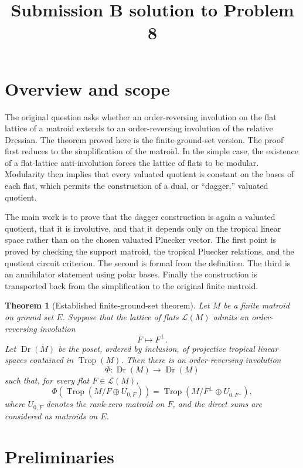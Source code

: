 \documentclass[12pt]{article}
\newtheorem{theorem}{Theorem}
\theoremstyle{definition}
\newcommand{\Trop}{\operatorname{Trop}}
\newcommand{\Dr}{\operatorname{Dr}}
\newcommand{\cL}{\mathcal L}
\begin{document}
\title{Submission B solution to Problem 8}
\date{}
\maketitle

\section*{Overview and scope}

The original question asks whether an order-reversing involution on the flat lattice of a matroid extends to an order-reversing involution of the relative Dressian.  The theorem proved here is the finite-ground-set version.  The proof first reduces to the simplification of the matroid.  In the simple case, the existence of a flat-lattice anti-involution forces the lattice of flats to be modular.  Modularity then implies that every valuated quotient is constant on the bases of each flat, which permits the construction of a dual, or ``dagger,'' valuated quotient.

The main work is to prove that the dagger construction is again a valuated quotient, that it is involutive, and that it depends only on the tropical linear space rather than on the chosen valuated Pluecker vector.  The first point is proved by checking the support matroid, the tropical Pluecker relations, and the quotient circuit criterion.  The second is formal from the definition.  The third is an annihilator statement using polar bases.  Finally the construction is transported back from the simplification to the original finite matroid.

\begin{theorem}[Established finite-ground-set theorem]\label{thm:main}
Let \(M\) be a finite matroid on ground set \(E\).  Suppose that the lattice of flats \(\cL(M)\) admits an order-reversing involution
\[
F\longmapsto F^\perp .
\]
Let \(\Dr(M)\) be the poset, ordered by inclusion, of projective tropical linear spaces contained in \(\Trop(M)\).  Then there is an order-reversing involution
\[
\Phi:\Dr(M)\longrightarrow \Dr(M)
\]
such that, for every flat \(F\in \cL(M)\),
\[
\Phi\!\left(\Trop(M/F\oplus U_{0,F})\right)
=
\Trop(M/F^\perp\oplus U_{0,F^\perp}),
\]
where \(U_{0,F}\) denotes the rank-zero matroid on \(F\), and the direct sums are considered as matroids on \(E\).
\end{theorem}

\section*{Preliminaries}
\end{document}
